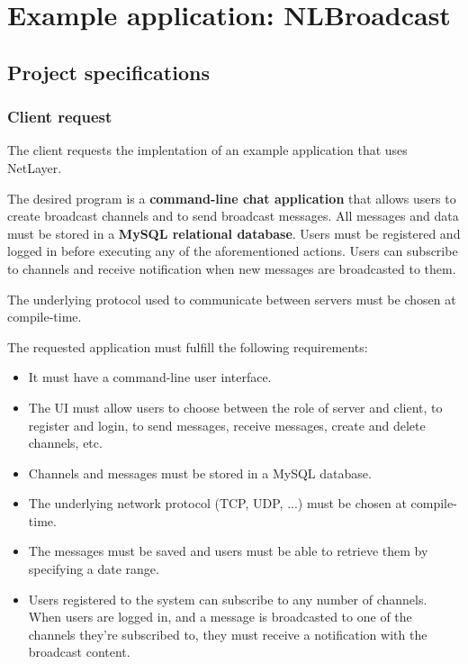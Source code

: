 \documentclass[11pt]{report}
\newcommand{\+}{\discretionary{\mbox{\scriptsize$\hookleftarrow$}}{}{}}
\renewcommand\emph{\textbf}
\begin{document}
\part{Example application: NLBroadcast}
    
    \chapter{Project specifications}    

        \section{Client request}
            The client requests the implentation of an example application that uses NetLayer. 
            
            The desired program is a \emph{command-line chat application} that allows users to create broadcast channels and to send broadcast messages. All messages and data must be stored in a \emph{MySQL relational database}. Users must be registered and logged in before executing any of the aforementioned actions. Users can subscribe to channels and receive notification when new messages are broadcasted to them.

            The underlying protocol used to communicate between servers must be chosen at compile-time.

            The requested application must fulfill the following requirements:

            \begin{itemize}
                \item It must have a command-line user interface. 
                \item The UI must allow users to choose between the role of server and client, to register and login, to send messages, receive messages, create and delete channels, etc.
                \item Channels and messages must be stored in a MySQL database.
                \item The underlying network protocol (TCP, UDP, ...) must be chosen at compile-time.
                \item The messages must be saved and users must be able to retrieve them by specifying a date range.
                \item Users registered to the system can subscribe to any number of channels. When users are logged in, and a message is broadcasted to one of the channels they're subscribed to, they must receive a notification with the broadcast content.
            \end{itemize}
\end{document}

